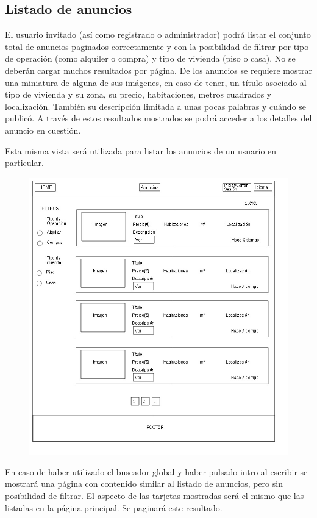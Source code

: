 \subsection{Listado de anuncios}
El usuario invitado (as\'{i} como registrado o administrador) podr\'{a} listar el conjunto total de anuncios paginados correctamente y con la posibilidad de filtrar por tipo de operaci\'{o}n (como alquiler o compra) y tipo de vivienda (piso o casa). No se deber\'{a}n cargar muchos resultados por p\'{a}gina. De los anuncios se requiere mostrar una miniatura de alguna de sus im\'{a}genes, en caso de tener, un t\'{i}tulo asociado al tipo de vivienda y su zona, su precio, habitaciones, metros cuadrados y localizaci\'{o}n. Tambi\'{e}n su descripci\'{o}n limitada a unas pocas palabras y cu\'{a}ndo se public\'{o}. A trav\'{e}s de estos resultados mostrados se podr\'{a} acceder a los detalles del anuncio en cuesti\'{o}n.

Esta misma vista ser\'{a} utilizada para listar los anuncios de un usuario en particular.


\begin{figure}[h!]
\centering
\includegraphics[width=.6\textwidth]{Img/VisionAplicacion/vision_3.jpg}
\end{figure}

En caso de haber utilizado el buscador global y haber pulsado intro al escribir se mostrar\'{a} una p\'{a}gina con contenido similar al listado de anuncios, pero sin posibilidad de filtrar. El aspecto de las tarjetas mostradas ser\'{a} el mismo que las listadas en la p\'{a}gina principal. Se paginar\'{a} este resultado.

